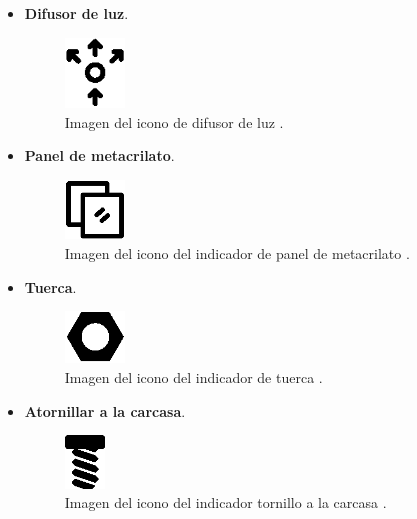 \begin{itemize}
    \item \textbf{Difusor de luz}. 
    \begin{figure}[H]
        \centering
        \includegraphics[width=0.15\textwidth]{imagenes/Capitulos/Cap05/Difusion.png}
        \caption{Imagen del icono de difusor de luz \cite{Repo:ImagenDifusor}.}
        \label{fig:difusionIcono}
    \end{figure}
    \newpage
    \item \textbf{Panel de metacrilato}. 
    \begin{figure}[H]
        \centering
        \includegraphics[width=0.15\textwidth]{imagenes/Capitulos/Cap05/Glass.png}
        \caption{Imagen del icono del indicador de panel de metacrilato \cite{Repo:ImagenGlass}.}
        \label{fig:MetacrilatoIcono}
    \end{figure}
    \item \textbf{Tuerca}. 
    \begin{figure}[H]
        \centering
        \includegraphics[width=0.15\textwidth]{imagenes/Capitulos/Cap05/Nut.png}
        \caption{Imagen del icono del indicador de tuerca \cite{Repo:ImagenNut}.}
        \label{fig:TuercaIcono}
    \end{figure}
    \item \textbf{Atornillar a la carcasa}. 
    \begin{figure}[H]
        \centering
        \includegraphics[width=0.1\textwidth]{imagenes/Capitulos/Cap05/Screw.png}
        \caption{Imagen del icono del indicador tornillo a la carcasa \cite{Repo:ImagenScrew}.}
        \label{fig:TornilloIcono}
    \end{figure}
\end{itemize}